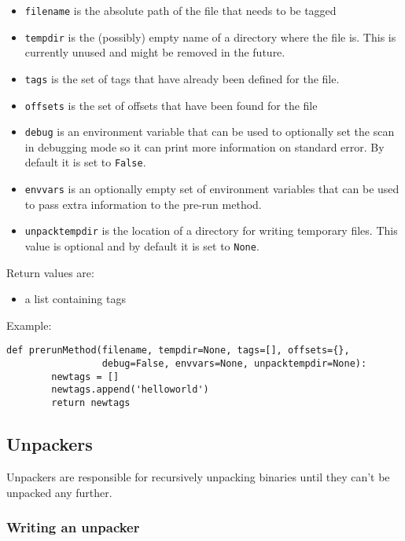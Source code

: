 \documentclass[10pt]{article}
\begin{document}
\begin{itemize}
\item \texttt{filename} is the absolute path of the file that needs to be tagged
\item \texttt{tempdir} is the (possibly) empty name of a directory where the
file is. This is currently unused and might be removed in the future.
\item \texttt{tags} is the set of tags that have already been defined for the
file.
\item \texttt{offsets} is the set of offsets that have been found for the file
\item \texttt{debug} is an environment variable that can be used to optionally
set the scan in debugging mode so it can print more information on standard
error. By default it is set to \texttt{False}.
\item \texttt{envvars} is an optionally empty set of environment variables that
can be used to pass extra information to the pre-run method.
\item \texttt{unpacktempdir} is the location of a directory for writing
temporary files. This value is optional and by default it is set to
\texttt{None}.
\end{itemize}

Return values are:

\begin{itemize}
\item a list containing tags
\end{itemize}

Example:

\begin{verbatim}
def prerunMethod(filename, tempdir=None, tags=[], offsets={},
                 debug=False, envvars=None, unpacktempdir=None):
        newtags = []
        newtags.append('helloworld')
        return newtags
\end{verbatim}

\subsection{Unpackers}

Unpackers are responsible for recursively unpacking binaries until they
can't be unpacked any further.

\subsubsection{Writing an unpacker}
\end{document}
